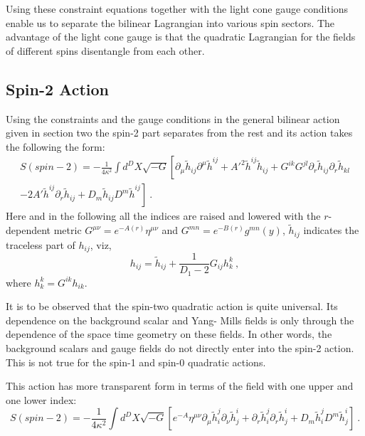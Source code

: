 \documentclass[a4paper,12pt]{article}
\begin{document}
Using these constraint equations together with the light cone gauge
conditions enable us to separate the bilinear Lagrangian into various
spin sectors. The advantage of the light cone gauge is that the
quadratic Lagrangian for the  fields of different spins disentangle
from each other.

\subsection{Spin-2 Action}
Using the constraints and the gauge conditions in the general
bilinear action given in section two the spin-2 part separates from
the rest and its  action takes the following the form:
\begin{eqnarray}
 S(spin-2)= -\frac{1}{4\kappa^2}\int d^D X \sqrt{-G}\left[
\partial_\mu \tilde h_{ij}\partial^{\mu} \tilde h^{ij} + {A'}^2
\tilde h^{ij}\tilde h_{ij} + G^{ik}G^{jl}\partial_r \tilde
h_{ij}\partial_r \tilde h_{kl} \right.\\
\nonumber
\left. - 2 A' \tilde h^{ij}\partial_r \tilde h_{ij} + D_m \tilde
h_{ij} D^m \tilde h^{ij} \right]~.
\label{spin2}
\end{eqnarray}
Here and in the following all the  indices are raised and lowered
with the $r$-dependent metric $G^{\mu\nu}= e^{-A(r)} \eta ^{\mu\nu}$
and $G^{mn}= e^{-B(r)}g^{mn}(y)$,  $\tilde h_{ij}$ indicates the
traceless part of $h_{ij}$, viz,
\begin{equation}
h_{ij} = \tilde h_{ij} + \frac{1}{D_1-2}G_{ij}h_k ^{k}~,
\end{equation}
where $ h_k ^{k} = G^{ik}h_{ik}$.

It is to be observed that the spin-two quadratic action is quite
universal. Its dependence on the background scalar and Yang- Mills
fields is only through the dependence of the space time geometry on
these fields. In other words, the background
scalars and gauge fields do not directly enter into the spin-2
action. This is not true for the spin-1 and spin-0 quadratic actions.

This action has more transparent form in terms of the field with one
upper and one lower index:
\begin{equation}
 S(spin-2)= -\frac{1}{4\kappa^2}\int d^D X \sqrt{-G} \left[e^{-A}
\eta^{\mu\nu}\partial_\mu\tilde h_i^j\partial_{\nu}\tilde h^i_j  +
\partial_r \tilde h_i^j \partial_r \tilde h_j^i  + D_m \tilde h_i^j
D^m \tilde h^i_j\right]~.
\label{s2better}
\end{equation}
\end{document}
